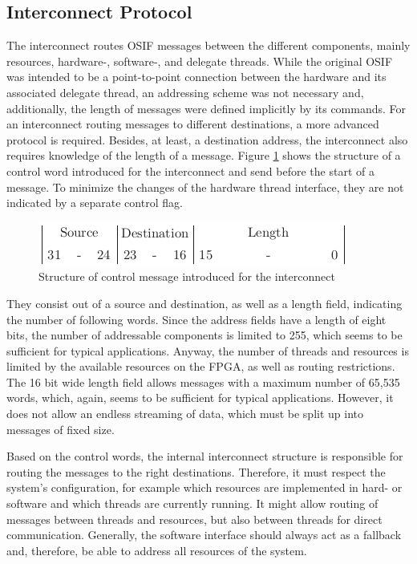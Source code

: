 \subsection{Interconnect Protocol}
The interconnect routes \ac{OSIF} messages between the different components,
mainly resources, hardware-, software-, and delegate threads. While the
original \ac{OSIF} was intended to be a point-to-point connection between the
hardware and its associated delegate thread, an addressing scheme was not
necessary and, additionally, the length of messages were defined implicitly by
its commands. For an interconnect routing messages to different destinations,
a more advanced protocol is required. Besides, at least, a destination
address, the interconnect also requires knowledge of the length of a message.
Figure \ref{fig:proto} shows the structure of a control word introduced for
the interconnect and send before the start of a message. To minimize the
changes of the hardware thread interface, they are not indicated by a separate
control flag.
\begin{figure}[tb]
	\centering
	\includegraphics{../figures/proto}
	\caption{Structure of control message introduced for the interconnect}
	\label{fig:proto}
\end{figure}
They consist out of a source and destination, as well as a length field,
indicating the number of following words. Since the address fields have a
length of eight bits, the number of addressable components is limited to 255,
which seems to be sufficient for typical applications. Anyway, the number of
threads and resources is limited by the available resources on the
\ac{FPGA}, as well as routing restrictions. The 16 bit wide length field
allows messages with a maximum number of 65,535 words, which, again, seems to
be sufficient for typical applications. However, it does not allow an endless
streaming of data, which must be split up into messages of fixed size.

Based on the control words, the internal interconnect structure is responsible
for routing the messages to the right destinations. Therefore, it must respect
the system's configuration, for example which resources are implemented in
hard- or software and which threads are currently running. It might allow
routing of messages between threads and resources, but also between threads
for direct communication. Generally, the software interface should always act
as a fallback and, therefore, be able to address all resources of the system.

